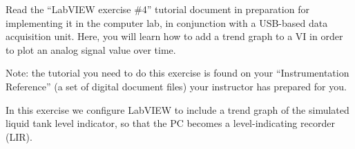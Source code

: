 

Read the ``LabVIEW exercise \#4'' tutorial document in preparation for implementing it in the computer lab, in conjunction with a USB-based data acquisition unit.  Here, you will learn how to add a trend graph to a VI in order to plot an analog signal value over time.

\vskip 10pt

Note: the tutorial you need to do this exercise is found on your ``Instrumentation Reference'' (a set of digital document files) your instructor has prepared for you.














In this exercise we configure LabVIEW to include a trend graph of the simulated liquid tank level indicator, so that the PC becomes a level-indicating recorder (LIR).




